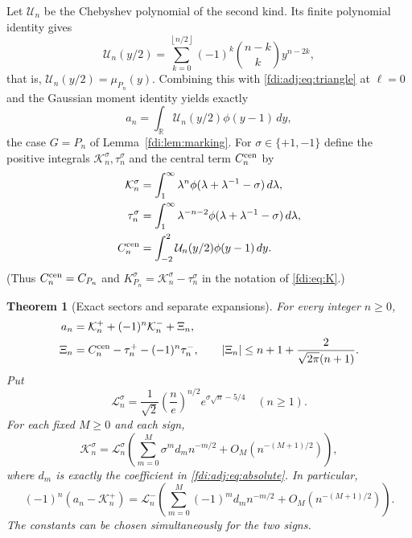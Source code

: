 \documentclass[11pt,letterpaper]{article}
\newtheorem{theorem}{Theorem}[section]
\theoremstyle{remark}\newtheorem{remark}[theorem]{Remark}
\newcommand{\floor}[1]{\left\lfloor #1\right\rfloor}
\begin{document}
Let $\mathcal U_n$ be the Chebyshev polynomial of the second kind. Its finite polynomial identity gives
\[
 \mathcal U_n(y/2)=\sum_{k=0}^{\floor{n/2}}(-1)^k\binom{n-k}{k}y^{n-2k},
\]
that is, $\mathcal U_n(y/2)=\mu_{P_n}(y)$. Combining this with \eqref{fdi:adj:eq:triangle} at $\ell=0$ and the Gaussian moment identity yields exactly
\begin{equation}\label{fdi:adj:eq:chebint}
 a_n=\int_{\mathbb R}\mathcal U_n(y/2)\phi(y-1)\,dy,
\end{equation}
the case $G=P_n$ of Lemma~\ref{fdi:lem:marking}. For $\sigma\in\{+1,-1\}$ define the positive integrals $\mathcal K_n^\sigma,\tau_n^\sigma$ and the central term $C_n^{\rm cen}$ by
\begin{align*}
 \mathcal K_n^\sigma&=\int_1^\infty\lambda^n
       \phi(\lambda+\lambda^{-1}-\sigma)\,d\lambda,\\
 \tau_n^\sigma&=\int_1^\infty\lambda^{-n-2}
       \phi(\lambda+\lambda^{-1}-\sigma)\,d\lambda,\\
 C_n^{\rm cen}&=\int_{-2}^2\mathcal U_n(y/2)\phi(y-1)\,dy.
\end{align*}
(Thus $C_n^{\rm cen}=C_{P_n}$ and $K_{P_n}^\sigma=\mathcal K_n^\sigma-\tau_n^\sigma$ in the notation of \eqref{fdi:eq:K}.)
\begin{theorem}[Exact sectors and separate expansions]\label{fdi:adj:thm:sectors}
For every integer $n\ge0$,
\begin{align}
 a_n&=\mathcal K_n^++(-1)^n\mathcal K_n^-+\Xi_n,\label{fdi:adj:eq:exactsectors}\\
 \Xi_n&=C_n^{\rm cen}-\tau_n^+-(-1)^n\tau_n^-,\qquad
 |\Xi_n|\le n+1+\frac{2}{\sqrt{2\pi}(n+1)}.\label{fdi:adj:eq:Rbound}
\end{align}
Put
\[
 \mathcal L_n^\sigma=\frac1{\sqrt2}\left(\frac ne\right)^{n/2}
                 e^{\sigma\sqrt n-5/4}\quad(n\ge1).
\]
For each fixed $M\ge0$ and each sign,
\begin{equation}\label{fdi:adj:eq:separate}
 \mathcal K_n^\sigma=\mathcal L_n^\sigma
 \left(\sum_{m=0}^M\sigma^md_mn^{-m/2}
          +O_M(n^{-(M+1)/2})\right),
\end{equation}
where $d_m$ is exactly the coefficient in \eqref{fdi:adj:eq:absolute}. In particular,
\begin{equation}\label{fdi:adj:eq:isolated}
 (-1)^n(a_n-\mathcal K_n^+)=\mathcal L_n^-
 \left(\sum_{m=0}^M(-1)^md_mn^{-m/2}
          +O_M(n^{-(M+1)/2})\right).
\end{equation}
The constants can be chosen simultaneously for the two signs.
\end{theorem}
\end{document}

